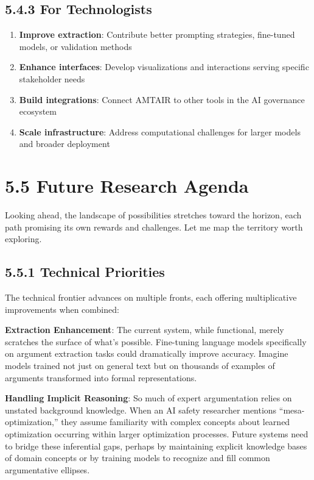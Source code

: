 \documentclass[
  11pt,
  letterpaper,
  openany]{book}
\providecommand{\tightlist}{%
  \setlength{\itemsep}{0pt}\setlength{\parskip}{0pt}}
\begin{document}
\subsection{5.4.3 For
Technologists}\label{sec-technologist-recommendations}

\begin{enumerate}
\def\labelenumi{\arabic{enumi}.}
\tightlist
\item
  \textbf{Improve extraction}: Contribute better prompting strategies,
  fine-tuned models, or validation methods
\item
  \textbf{Enhance interfaces}: Develop visualizations and interactions
  serving specific stakeholder needs
\item
  \textbf{Build integrations}: Connect AMTAIR to other tools in the AI
  governance ecosystem
\item
  \textbf{Scale infrastructure}: Address computational challenges for
  larger models and broader deployment
\end{enumerate}

\section{5.5 Future Research Agenda}\label{sec-future-research-agenda}

Looking ahead, the landscape of possibilities stretches toward the
horizon, each path promising its own rewards and challenges. Let me map
the territory worth exploring.

\subsection{5.5.1 Technical Priorities}\label{sec-technical-priorities}

The technical frontier advances on multiple fronts, each offering
multiplicative improvements when combined:

\textbf{Extraction Enhancement}: The current system, while functional,
merely scratches the surface of what's possible. Fine-tuning language
models specifically on argument extraction tasks could dramatically
improve accuracy. Imagine models trained not just on general text but on
thousands of examples of arguments transformed into formal
representations.

\textbf{Handling Implicit Reasoning}: So much of expert argumentation
relies on unstated background knowledge. When an AI safety researcher
mentions ``mesa-optimization,'' they assume familiarity with complex
concepts about learned optimization occurring within larger optimization
processes. Future systems need to bridge these inferential gaps, perhaps
by maintaining explicit knowledge bases of domain concepts or by
training models to recognize and fill common argumentative ellipses.
\end{document}
